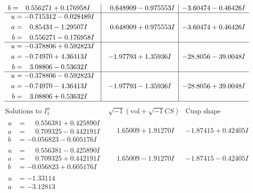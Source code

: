 \documentclass[1p]{elsarticle_modified}
\theoremstyle{definition}
\newcommand{\I}{\sqrt{-1}}
\begin{document}
$$\begin{array}{c|c|c}
\begin{aligned}
b &= \phantom{-}0.556271 + 0.176958 I\end{aligned}
 & \phantom{-}0.648909 - 0.975553 I & -3.60474 - 0.46426 I \\ \hline\begin{aligned}
u &= -0.715312 - 0.028489 I \\
a &= \phantom{-}0.85434 - 1.29507 I \\
b &= \phantom{-}0.556271 - 0.176958 I\end{aligned}
 & \phantom{-}0.648909 + 0.975553 I & -3.60474 + 0.46426 I \\ \hline\begin{aligned}
u &= -0.378806 + 0.592823 I \\
a &= -0.74970 + 4.36413 I \\
b &= \phantom{-}3.08806 - 0.53632 I\end{aligned}
 & -1.97793 + 1.35936 I & -28.8056 - 39.0048 I \\ \hline\begin{aligned}
u &= -0.378806 - 0.592823 I \\
a &= -0.74970 - 4.36413 I \\
b &= \phantom{-}3.08806 + 0.53632 I\end{aligned}
 & -1.97793 - 1.35936 I & -28.8056 + 39.0048 I\\
 \hline 
 \end{array}$$\newpage$$\begin{array}{c|c|c}  
\text{Solutions to }I^u_{1}& \I (\text{vol} + \sqrt{-1}CS) & \text{Cusp shape}\\
 \hline 
\begin{aligned}
u &= \phantom{-}0.556381 + 0.425890 I \\
a &= \phantom{-}0.709325 - 0.442191 I \\
b &= -0.056823 - 0.605176 I\end{aligned}
 & \phantom{-}1.65009 + 1.91270 I & -1.87415 + 0.42405 I \\ \hline\begin{aligned}
u &= \phantom{-}0.556381 - 0.425890 I \\
a &= \phantom{-}0.709325 + 0.442191 I \\
b &= -0.056823 + 0.605176 I\end{aligned}
 & \phantom{-}1.65009 - 1.91270 I & -1.87415 - 0.42405 I \\ \hline\begin{aligned}
u &= -1.33114\phantom{ +0.000000I} \\
a &= -3.12813\phantom{ +0.000000I} \\

\end{aligned}
\end{array}$$
\end{document}
